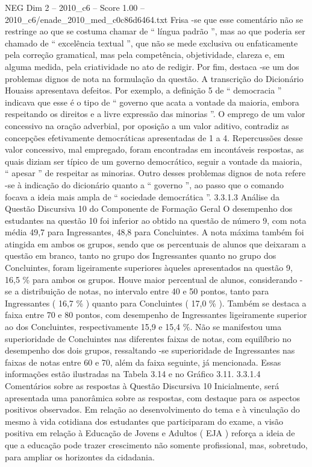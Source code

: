 \begin{textsample}{NEG Dim 2 – 2010\_c6 – Score 1.00 – 2010\_c6/enade\_2010\_med\_c0c86d6464.txt}
Frisa -se que esse comentário não se restringe ao que se costuma chamar de “ língua padrão ”, mas ao que poderia ser chamado de “ excelência textual ”, que não se mede exclusiva ou enfaticamente pela correção gramatical, mas pela competência, objetividade, clareza e, em alguma medida, pela criatividade no ato de redigir.
Por fim, destaca -se um dos problemas dignos de nota na formulação da questão.
A transcrição do Dicionário Houaiss apresentava defeitos.
Por exemplo, a definição 5 de “ democracia ” indicava que esse é o tipo de “ governo que acata a vontade da maioria, embora respeitando os direitos e a livre expressão das minorias ”.
O emprego de um valor concessivo na oração adverbial, por oposição a um valor aditivo, contradiz as concepções efetivamente democráticas apresentadas de 1 a 4.
Repercussões desse valor concessivo, mal empregado, foram encontradas em incontáveis respostas, as quais diziam ser típico de um governo democrático, seguir a vontade da maioria, “ apesar ” de respeitar as minorias.
Outro desses problemas dignos de nota refere -se à indicação do dicionário quanto a “ governo ”, ao passo que o comando focava a ideia mais ampla de “ sociedade democrática ”. 3.3.1.3 Análise da Questão Discursiva 10 do Componente de Formação Geral O desempenho dos estudantes na questão 10 foi inferior ao obtido na questão de número 9, com nota média 49,7 para Ingressantes, 48,8 para Concluintes.
A nota máxima também foi atingida em ambos os grupos, sendo que os percentuais de alunos que deixaram a questão em branco, tanto no grupo dos Ingressantes quanto no grupo dos Concluintes, foram ligeiramente superiores àqueles apresentados na questão 9, 16,5 \% para ambos os grupos.
Houve maior percentual de alunos, considerando -se a distribuição de notas, no intervalo entre 40 e 50 pontos, tanto para Ingressantes ( 16,7 \% ) quanto para Concluintes ( 17,0 \% ).
Também se destaca a faixa entre 70 e 80 pontos, com desempenho de Ingressantes ligeiramente superior ao dos Concluintes, respectivamente 15,9 e 15,4 \%.
Não se manifestou uma superioridade de Concluintes nas diferentes faixas de notas, com equilíbrio no desempenho dos dois grupos, ressaltando -se superioridade de Ingressantes nas faixas de notas entre 60 e 70, além da faixa seguinte, já mencionada.
Essas informações estão ilustradas na Tabela 3.14 e no Gráfico 3.11. 3.3.1.4 Comentários sobre as respostas à Questão Discursiva 10 Inicialmente, será apresentada uma panorâmica sobre as respostas, com destaque para os aspectos positivos observados.
Em relação ao desenvolvimento do tema e à vinculação do mesmo à vida cotidiana dos estudantes que participaram do exame, a visão positiva em relação à Educação de Jovens e Adultos ( EJA ) reforça a ideia de que a educação pode trazer crescimento não somente profissional, mas, sobretudo, para ampliar os horizontes da cidadania.

\end{textsample}
